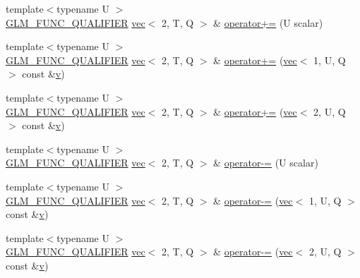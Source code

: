 \begin{DoxyCompactItemize}
{\footnotesize template$<$typename U $>$ }\\\mbox{\hyperlink{setup_8hpp_a33fdea6f91c5f834105f7415e2a64407}{G\+L\+M\+\_\+\+F\+U\+N\+C\+\_\+\+Q\+U\+A\+L\+I\+F\+I\+ER}} \mbox{\hyperlink{structglm_1_1vec}{vec}}$<$ 2, T, Q $>$ \& \mbox{\hyperlink{structglm_1_1vec_3_012_00_01_t_00_01_q_01_4_a85009f198924c17e5830290e55c04323}{operator+=}} (U scalar)
\item 
{\footnotesize template$<$typename U $>$ }\\\mbox{\hyperlink{setup_8hpp_a33fdea6f91c5f834105f7415e2a64407}{G\+L\+M\+\_\+\+F\+U\+N\+C\+\_\+\+Q\+U\+A\+L\+I\+F\+I\+ER}} \mbox{\hyperlink{structglm_1_1vec}{vec}}$<$ 2, T, Q $>$ \& \mbox{\hyperlink{structglm_1_1vec_3_012_00_01_t_00_01_q_01_4_a5a24f12fc3b14e67842a4759cdca08b2}{operator+=}} (\mbox{\hyperlink{structglm_1_1vec}{vec}}$<$ 1, U, Q $>$ const \&\mbox{\hyperlink{_s_d_l__opengl_8h_a10a82eabcb59d2fcd74acee063775f90}{v}})
\item 
{\footnotesize template$<$typename U $>$ }\\\mbox{\hyperlink{setup_8hpp_a33fdea6f91c5f834105f7415e2a64407}{G\+L\+M\+\_\+\+F\+U\+N\+C\+\_\+\+Q\+U\+A\+L\+I\+F\+I\+ER}} \mbox{\hyperlink{structglm_1_1vec}{vec}}$<$ 2, T, Q $>$ \& \mbox{\hyperlink{structglm_1_1vec_3_012_00_01_t_00_01_q_01_4_aeddb35c29290a573a8e33b70c2bb5cd8}{operator+=}} (\mbox{\hyperlink{structglm_1_1vec}{vec}}$<$ 2, U, Q $>$ const \&\mbox{\hyperlink{_s_d_l__opengl_8h_a10a82eabcb59d2fcd74acee063775f90}{v}})
\item 
{\footnotesize template$<$typename U $>$ }\\\mbox{\hyperlink{setup_8hpp_a33fdea6f91c5f834105f7415e2a64407}{G\+L\+M\+\_\+\+F\+U\+N\+C\+\_\+\+Q\+U\+A\+L\+I\+F\+I\+ER}} \mbox{\hyperlink{structglm_1_1vec}{vec}}$<$ 2, T, Q $>$ \& \mbox{\hyperlink{structglm_1_1vec_3_012_00_01_t_00_01_q_01_4_a55b50722876c56ed99f91322a5f9a5b4}{operator-\/=}} (U scalar)
\item 
{\footnotesize template$<$typename U $>$ }\\\mbox{\hyperlink{setup_8hpp_a33fdea6f91c5f834105f7415e2a64407}{G\+L\+M\+\_\+\+F\+U\+N\+C\+\_\+\+Q\+U\+A\+L\+I\+F\+I\+ER}} \mbox{\hyperlink{structglm_1_1vec}{vec}}$<$ 2, T, Q $>$ \& \mbox{\hyperlink{structglm_1_1vec_3_012_00_01_t_00_01_q_01_4_a567c2cbb4b73916d5d4ae45058074aea}{operator-\/=}} (\mbox{\hyperlink{structglm_1_1vec}{vec}}$<$ 1, U, Q $>$ const \&\mbox{\hyperlink{_s_d_l__opengl_8h_a10a82eabcb59d2fcd74acee063775f90}{v}})
\item 
{\footnotesize template$<$typename U $>$ }\\\mbox{\hyperlink{setup_8hpp_a33fdea6f91c5f834105f7415e2a64407}{G\+L\+M\+\_\+\+F\+U\+N\+C\+\_\+\+Q\+U\+A\+L\+I\+F\+I\+ER}} \mbox{\hyperlink{structglm_1_1vec}{vec}}$<$ 2, T, Q $>$ \& \mbox{\hyperlink{structglm_1_1vec_3_012_00_01_t_00_01_q_01_4_ae73ba64842a46d90b3e6a61df288f70d}{operator-\/=}} (\mbox{\hyperlink{structglm_1_1vec}{vec}}$<$ 2, U, Q $>$ const \&\mbox{\hyperlink{_s_d_l__opengl_8h_a10a82eabcb59d2fcd74acee063775f90}{v}})

\end{DoxyCompactItemize}
